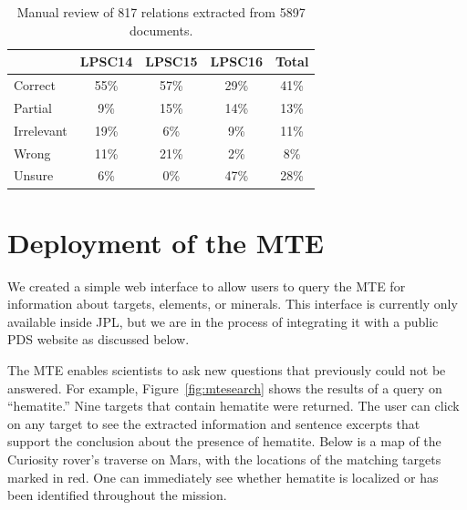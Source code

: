 \documentclass[letterpaper]{article} %
\begin{document}
\begin{table}
\caption{Manual review of 817 relations extracted from 5897 documents.} 
\label{tab:large}
\begin{center}
\begin{tabular}{l|ccc|c}
        & LPSC14 & LPSC15 & LPSC16 & Total \\ \hline
Correct    & 55\% & 57\% & 29\% & 41\% \\ \hline
Partial    &  9\% & 15\% & 14\% & 13\% \\
Irrelevant & 19\% &  6\% &  9\% & 11\% \\
Wrong      & 11\% & 21\% &  2\% &  8\% \\
Unsure     &  6\% &  0\% & 47\% & 28\% \\
\hline
\end{tabular}
\end{center}
\end{table}

\section{Deployment of the MTE}

We created a simple web interface to allow users to query the MTE for
information about targets, elements, or minerals.  This interface is
currently only available inside JPL, but we are in the process of
integrating it with a public PDS website as discussed below.

The MTE enables scientists to ask new questions that previously could
not be answered.  For example, Figure~\ref{fig:mtesearch} shows the
results of a query on ``hematite.''  Nine targets that contain
hematite were returned.  The user can click on any target to see the
extracted information and sentence excerpts that support the
conclusion about the presence of hematite.  Below is a map
of the Curiosity rover's traverse on Mars, with the locations of the
matching targets marked in red.  One can immediately see whether
hematite is localized or has been identified throughout the mission.
\end{document}

